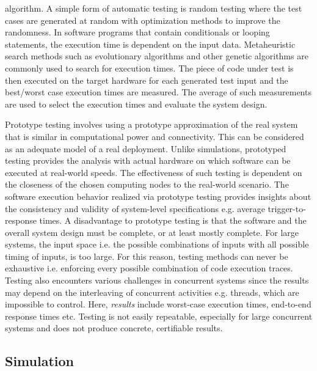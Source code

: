algorithm. A simple form of automatic testing is random testing where the test
cases are generated at random with optimization methods to improve the
randomness. In software programs that contain conditionals or looping
statements, the execution time is dependent on the input data. Metaheuristic
search methods such as evolutionary algorithms \cite{wegener1998verifying} and
other genetic algorithms \cite{wegener1997testing, puschner1998testing} are
commonly used to search for execution times. The piece of code under test is
then executed on the target hardware for each generated test input and the
best/worst case execution times are measured. The average of such measurements
are used to select the execution times and evaluate the system design.

Prototype testing involves using a prototype approximation of the real system
that is similar in computational power and connectivity. This can be considered
as an adequate model of a real deployment. Unlike simulations, prototyped
testing provides the analysis with actual hardware on which software can be
executed at real-world speeds. The effectiveness of such testing is dependent on
the closeness of the chosen computing nodes to the real-world scenario. The
software execution behavior realized via prototype testing provides insights
about the consistency and validity of system-level specifications e.g. average
trigger-to-response times. A disadvantage to prototype testing is that the
software and the overall system design must be complete, or at least mostly
complete. For large systems, the input space i.e. the possible combinations of
inputs with all possible timing of inputs, is too large. For this reason,
testing methods can never be exhaustive i.e. enforcing every possible
combination of code execution traces. Testing also encounters various challenges
in concurrent systems since the results may depend on the interleaving of
concurrent activities e.g. threads, which are impossible to control. Here,
\emph{results} include worst-case execution times, end-to-end response times
etc. Testing is not easily repeatable, especially for large concurrent systems
and does not produce concrete, certifiable results.

\subsection{Simulation}
 \label{sec:simulation}

